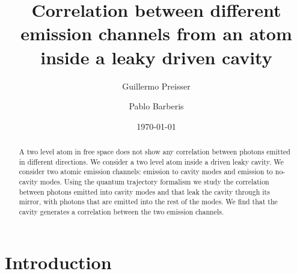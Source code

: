 \documentclass[%
 reprint,
 amsmath,amssymb,
 aps, 
]{revtex4-1}
\begin{document}

\title{Correlation between different emission channels from an atom inside a leaky driven cavity}%

\author{Guillermo Preisser}
\author{Pablo Barberis}%



\date{\today}%

\begin{abstract}
A two level atom in free space does not show any correlation between
  photons emitted in different directions. We consider a two level
  atom inside a driven leaky cavity. We consider two atomic emission
  channels: emission to cavity modes and emission to no-cavity modes.
  Using the quantum trajectory formalism we study the correlation
  between photons emitted into cavity modes and that leak the cavity
  through its mirror, with photons that are emitted into the rest of
  the modes. We find that the cavity generates a correlation between
  the two emission channels.
\end{abstract}

\maketitle


\section{Introduction}
\end{document}
